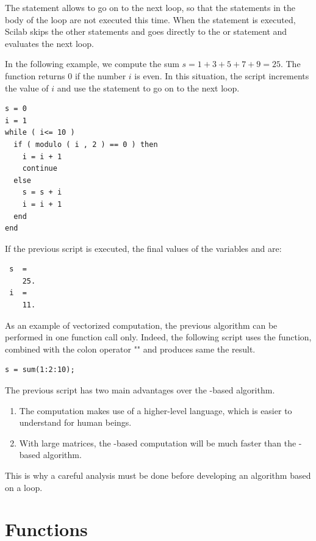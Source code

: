The  statement allows to go on to the 
next loop, so that the statements in the body of the 
loop are not executed this time.
When the  statement 
is executed, Scilab skips the other statements and goes 
directly to the  or 
statement and evaluates the next loop.

In the following example, we compute the sum 
$s = 1 + 3 + 5 + 7 + 9 = 25$. The 
function returns 0 if the number $i$ is even. 
In this situation, the script increments the value of $i$
and use the  statement to go 
on to the next loop.
\lstset{language=scilabscript}
\begin{lstlisting}
s = 0
i = 1
while ( i<= 10 )
  if ( modulo ( i , 2 ) == 0 ) then
    i = i + 1
    continue
  else
    s = s + i
    i = i + 1
  end
end
\end{lstlisting}
If the previous script is executed, the final 
values of the variables  and  are: 
\lstset{language=scilabscript}
\begin{lstlisting}
 s  =
    25.  
 i  =
    11.  
\end{lstlisting}

As an example of vectorized computation, the previous algorithm 
can be performed in one function call only. Indeed, the 
following script uses the  function, combined
with the colon operator "\scivar{:}" and produces same the 
result.
\lstset{language=scilabscript}
\begin{lstlisting}
s = sum(1:2:10);
\end{lstlisting}
The previous script has two main advantages over the -based 
algorithm.
\begin{enumerate}
\item The computation makes use of a higher-level language, which is 
easier to understand for human beings. 
\item With large matrices, the -based computation will be 
much faster than the -based algorithm. 
\end{enumerate}
This is why a careful analysis must be done before developing 
an algorithm based on a  loop.

\section{Functions}

